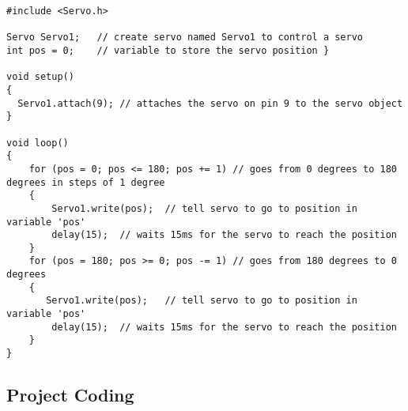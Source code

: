 \begin{lstlisting}[style=CStyle]
#include <Servo.h>

Servo Servo1;	// create servo named Servo1 to control a servo
int pos = 0;	// variable to store the servo position }

void setup() 
{  
  Servo1.attach(9);	// attaches the servo on pin 9 to the servo object  
} 

void loop() 
{ 
    for (pos = 0; pos <= 180; pos += 1)	// goes from 0 degrees to 180 degrees in steps of 1 degree  
    {
        Servo1.write(pos);	// tell servo to go to position in variable 'pos' 
        delay(15);	// waits 15ms for the servo to reach the position 
    }
    for (pos = 180; pos >= 0; pos -= 1) // goes from 180 degrees to 0 degrees 
    {
       Servo1.write(pos);	// tell servo to go to position in variable 'pos'  
        delay(15);	// waits 15ms for the servo to reach the position  
    } 
}
\end{lstlisting}
\subsection{Project Coding}


